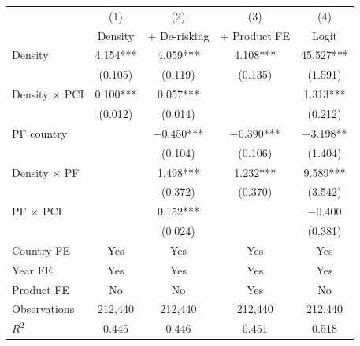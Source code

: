 \begin{tabular}{lcccc}
\toprule
 & (1) & (2) & (3) & (4) \\
 & Density & + De-risking & + Product FE & Logit \\
\midrule
Density & 4.154*** & 4.059*** & 4.108*** & 45.527*** \\
 & (0.105) & (0.119) & (0.135) & (1.591) \\
Density $\times$ PCI & 0.100*** & 0.057*** & & 1.313*** \\
 & (0.012) & (0.014) & & (0.212) \\
PF country & & $-$0.450*** & $-$0.390*** & $-$3.198** \\
 & & (0.104) & (0.106) & (1.404) \\
Density $\times$ PF & & 1.498*** & 1.232*** & 9.589*** \\
 & & (0.372) & (0.370) & (3.542) \\
PF $\times$ PCI & & 0.152*** & & $-$0.400 \\
 & & (0.024) & & (0.381) \\
\midrule
Country FE & Yes & Yes & Yes & Yes \\
Year FE & Yes & Yes & Yes & Yes \\
Product FE & No & No & Yes & No \\
Observations & 212,440 & 212,440 & 212,440 & 212,440 \\
$R^2$ & 0.445 & 0.446 & 0.451 & 0.518 \\
\bottomrule
\end{tabular}